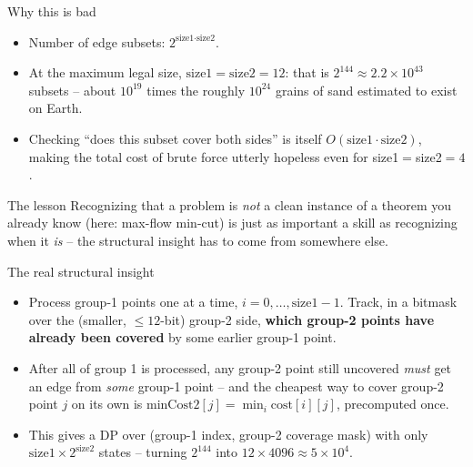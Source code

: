 \documentclass[11pt,aspectratio=169]{beamer}
\begin{document}
\begin{frame}{Why this is bad}
  \begin{itemize}
    \item Number of edge subsets: $2^{\text{size1}\cdot\text{size2}}$.
    \item At the maximum legal size, $\text{size1}=\text{size2}=12$: that is
    $2^{144} \approx 2.2\times10^{43}$ subsets -- about $10^{19}$ times the roughly
    $10^{24}$ grains of sand estimated to exist on Earth.
    \item Checking ``does this subset cover both sides'' is itself $O(\text{size1}
    \cdot\text{size2})$, making the total cost of brute force utterly hopeless even
    for size1$=$size2$=4$.
  \end{itemize}
  \begin{alertblock}{The lesson}
    Recognizing that a problem is \emph{not} a clean instance of a theorem you already
    know (here: max-flow min-cut) is just as important a skill as recognizing when it
    \emph{is} -- the structural insight has to come from somewhere else.
  \end{alertblock}
\end{frame}

\begin{frame}{The real structural insight}
  \begin{itemize}
    \item Process group-1 points one at a time, $i = 0, \dots, \text{size1}-1$. Track,
    in a bitmask over the (smaller, $\le 12$-bit) group-2 side, \textbf{which group-2
    points have already been covered} by some earlier group-1 point.
    \item After all of group 1 is processed, any group-2 point still uncovered
    \emph{must} get an edge from \emph{some} group-1 point -- and the cheapest way to
    cover group-2 point $j$ on its own is $\text{minCost2}[j] = \min_i \text{cost}[i][j]$,
    precomputed once.
    \item This gives a DP over (group-1 index, group-2 coverage mask) with only
    $\text{size1}\times2^{\text{size2}}$ states -- turning $2^{144}$ into
    $12\times4096 \approx 5\times10^4$.
  \end{itemize}
\end{frame}
\end{document}
